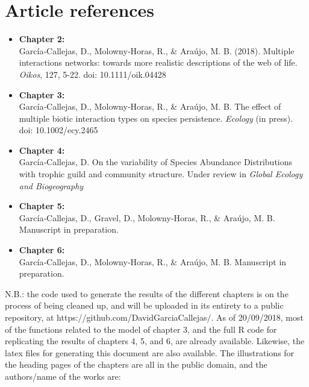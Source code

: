 \documentclass[12pt,a4paper,twoside,fleqn]{memoir}
\begin{document}
\begin{abstract}
\end{abstract}

\clearpage


\section*{Article references}

\begin{itemize}
  \item \textbf{Chapter 2:} \\
  García‐Callejas, D., Molowny‐Horas, R., \& Araújo, M. B. (2018). Multiple interactions networks: towards more realistic descriptions of the web of life. \textit{Oikos}, 127, 5-22. doi: 10.1111/oik.04428
  \item \textbf{Chapter 3:} \\
  García‐Callejas, D., Molowny‐Horas, R., \& Araújo, M. B. The effect of multiple biotic interaction types on species persistence. \textit{Ecology} (in press). doi: 10.1002/ecy.2465
  \item \textbf{Chapter 4:} \\
  García‐Callejas, D. On the variability of Species Abundance Distributions with trophic guild and community structure. Under review in \textit{Global Ecology and Biogeography}
  \item \textbf{Chapter 5:} \\
  García‐Callejas, D., Gravel, D., Molowny‐Horas, R., \& Araújo, M. B. Manuscript in preparation.
  \item \textbf{Chapter 6:} \\
  García‐Callejas, D., Molowny‐Horas, R., \& Araújo, M. B. Manuscript in preparation.
\end{itemize}

N.B.: the code used to generate the results of the different chapters is on the process of being cleaned up, and will be uploaded in its entirety to a public repository, at https://github.com/DavidGarciaCallejas/. As of 20/09/2018, most of the functions related to the model of chapter 3, and the full R code for replicating the results of chapters 4, 5, and 6, are already available. Likewise, the latex files for generating this document are also available. The illustrations for the heading pages of the chapters are all in the public domain, and the authors/name of the works are:
\end{document}
